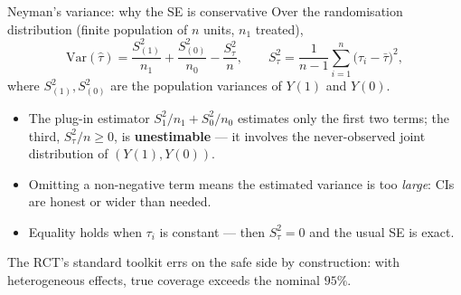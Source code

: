\documentclass[aspectratio=169,11pt]{beamer}
\begin{document}
\begin{frame}{Neyman's variance: why the SE is conservative}
  Over the randomisation distribution (finite population of $n$ units, $n_1$ treated),
  \[
    \mathrm{Var}(\hat\tau)
      = \frac{S_{(1)}^2}{n_1} + \frac{S_{(0)}^2}{n_0} - \frac{S_{\tau}^2}{n},
    \qquad
    S_{\tau}^2 = \frac{1}{n-1}\sum_{i=1}^n\big(\tau_i - \bar\tau\big)^2 ,
  \]
  where $S_{(1)}^2, S_{(0)}^2$ are the population variances of $Y(1)$ and $Y(0)$.
  \begin{readme}
    \begin{itemize}
      \item The plug-in estimator $S_1^2/n_1 + S_0^2/n_0$ estimates only the first two
            terms; the third, $S_\tau^2/n \ge 0$, is \textbf{unestimable} --- it involves
            the never-observed joint distribution of $(Y(1),Y(0))$.
      \item Omitting a non-negative term means the estimated variance is too
            \emph{large}: CIs are honest or wider than needed.
      \item Equality holds when $\tau_i$ is constant --- then $S^2_\tau=0$ and the
            usual SE is exact.
    \end{itemize}
  \end{readme}
  \begin{takeaway}
    The RCT's standard toolkit errs on the safe side by construction: with heterogeneous
    effects, true coverage exceeds the nominal $95\%$.
  \end{takeaway}
\end{frame}
\end{document}
